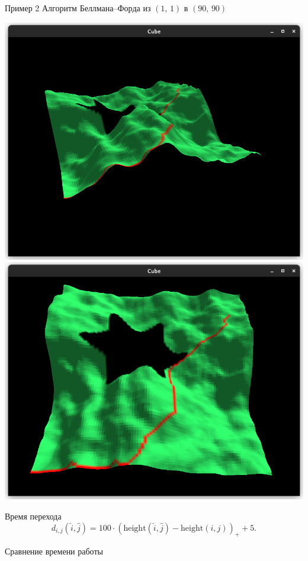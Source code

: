     \begin{frame}[t]{Пример 2}
        Алгоритм Беллмана--Форда из $(1,\,1)$ в $(90,\,90)$
        \begin{center}
            \includegraphics[scale=0.18]{content/bf.png}
            \includegraphics[scale=0.18]{content/bf-top.png}
        \end{center}
        Время перехода
        \[
            d_{i,j}(\hat i, \hat j) = 100\cdot(\mathrm{height}(\hat i, \hat j) - \mathrm{height}(i, j))_{+} + 5.
        \]
    \end{frame}
    \begin{frame}[t]{Сравнение времени работы}
    \end{frame}
